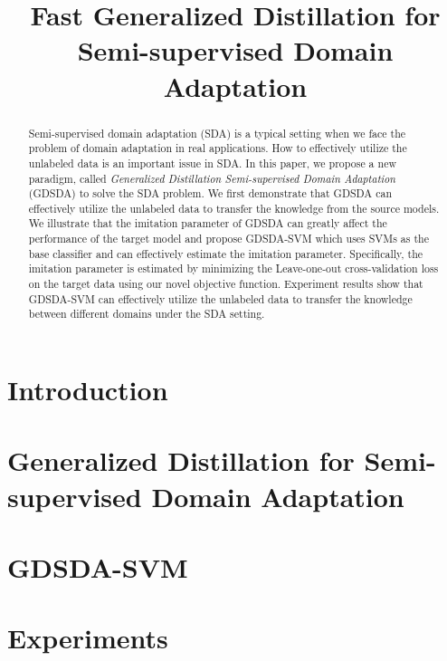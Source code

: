 \documentclass{llncs}
\begin{document}
\title{Fast Generalized Distillation for Semi-supervised Domain Adaptation}
\maketitle
\begin{abstract}
	Semi-supervised domain adaptation (SDA) is a typical setting when we face the problem of domain adaptation in real applications. How to effectively utilize the unlabeled data is an important issue in SDA. In this paper, we propose a new paradigm, called \textit{Generalized Distillation Semi-supervised Domain Adaptation} (GDSDA) to solve the SDA problem.
	We first demonstrate that GDSDA can effectively utilize the unlabeled data to transfer the knowledge from the source models. We illustrate that the imitation parameter of GDSDA can greatly affect the performance of the target model and propose GDSDA-SVM which uses SVMs as the base classifier and can effectively estimate the imitation parameter. Specifically, the imitation parameter is estimated by minimizing the Leave-one-out cross-validation loss on the target data using our novel objective function. Experiment results show that GDSDA-SVM can effectively utilize the unlabeled data to transfer the knowledge between different domains under the SDA setting.
\end{abstract}

\section{Introduction}



%

\section{Generalized Distillation for Semi-supervised Domain Adaptation}\label{sec:gdda}



\section{GDSDA-SVM}\label{sec:svm}


\section{Experiments}\label{sec:exp}

\end{document}
